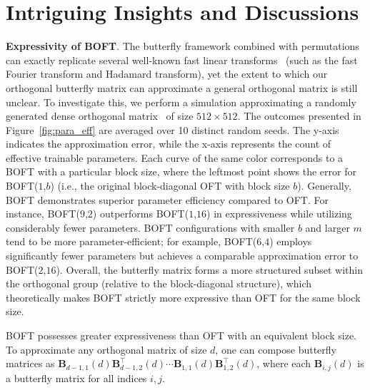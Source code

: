 \section{Intriguing Insights and Discussions}

\textbf{Expressivity of BOFT}. The butterfly framework combined with permutations can exactly replicate several well-known fast linear transforms~\cite{dao2019learning,dao2019kaleidoscope} (such as the fast Fourier transform and Hadamard transform), yet the extent to which our orthogonal butterfly matrix can approximate a general orthogonal matrix is still unclear. To investigate this, we perform a simulation approximating a randomly generated dense orthogonal matrix~\cite{anderson1987generation} of size $512\times 512$. The outcomes presented in Figure~\ref{fig:para_eff} are averaged over 10 distinct random seeds. The y-axis indicates the approximation error, while the x-axis represents the count of effective trainable parameters. Each curve of the same color corresponds to a BOFT with a particular block size, where the leftmost point shows the error for BOFT($1$,$b$) (i.e., the original block-diagonal OFT with block size $b$). Generally, BOFT demonstrates superior parameter efficiency compared to OFT. For instance, BOFT($9$,$2$) outperforms BOFT($1$,$16$) in expressiveness while utilizing considerably fewer parameters. BOFT configurations with smaller $b$ and larger $m$ tend to be more parameter-efficient; for example, BOFT($6$,$4$) employs significantly fewer parameters but achieves a comparable approximation error to BOFT($2$,$16$). Overall, the butterfly matrix forms a more structured subset within the orthogonal group (relative to the block-diagonal structure), which theoretically makes BOFT strictly more expressive than OFT for the same block size.

\begin{theorem}\label{thm:exp_boft}
    BOFT possesses greater expressiveness than OFT with an equivalent block size. To approximate any orthogonal matrix of size $d$, one can compose butterfly matrices as $\bm{B}_{d-1,1}(d)\bm{B}^\top_{d-1,2}(d)\cdots\bm{B}_{1,1}(d)\bm{B}^\top_{1,2}(d)$, where each $\bm{B}_{i,j}(d)$ is a butterfly matrix for all indices $i,j$.
\end{theorem}

